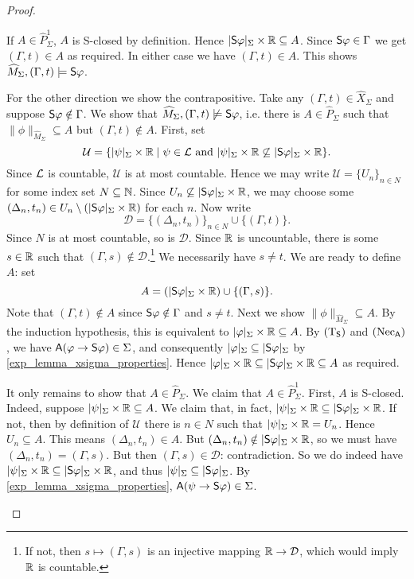 \begin{proof}
\begin{itemize}
    If $A \in \widehat{P}_\Sigma^1$, $A$ is S-closed by definition.  Hence
    $|\S\phi|_\Sigma \times \R \subseteq A$. Since $\S\phi \in \Gamma$ we get
    $(\Gamma, t) \in A$ as required.
    In either case we have $(\Gamma, t) \in A$. This shows $\widehat{M}_\Sigma,
    (\Gamma, t) \models \S\phi$.

    For the other direction we show the contrapositive. Take any $(\Gamma, t)
    \in \widehat{X}_\Sigma$ and suppose $\S\phi \notin \Gamma$. We show that
    $\widehat{M}_\Sigma, (\Gamma, t) \not\models \S\phi$, i.e. there is $A \in
    \widehat{P}_\Sigma$ such that $\|\phi\|_{\widehat{M}_\Sigma} \subseteq A$
    but $(\Gamma, t) \notin A$.
    First, set
    \[
        \mathcal{U} = \{
        |\psi|_\Sigma \times \R
        \mid
        \psi \in \cL \text{ and }
        |\psi|_\Sigma \times \R \not\subseteq |\S\phi|_\Sigma \times \R
        \}.
    \]
    Since $\cL$ is countable, $\mathcal{U}$ is at most countable.
    Hence we may write $\mathcal{U} = \{U_n\}_{n \in N}$ for some
    index set $N \subseteq \N$. Since $U_n \not\subseteq
    |\S\phi|_\Sigma \times \R$, we may choose some $(\Delta_n, t_n)
    \in U_n \setminus (|\S\phi|_\Sigma \times \R)$ for each $n$. Now
    write
    \[
      \mathcal{D} = \{(\Delta_n, t_n)\}_{n \in N} \cup \{(\Gamma,
      t)\}.
    \]
    Since $N$ is at most countable, so is $\mathcal{D}$.  Since
    $\R$ is uncountable, there is some $s \in \R$ such that $(\Gamma,
    s) \notin \mathcal{D}$.\footnote{If not, then $s \mapsto
    (\Gamma, s)$ is an injective mapping $\R \to \mathcal{D}$, which
    would imply $\R$ is countable.} We necessarily have $s \ne t$. We
    are ready to define $A$: set
    \[
      A = (|\S\phi|_\Sigma \times \R) \cup \{(\Gamma, s)\}.
    \]
    Note that $(\Gamma, t) \notin A$ since $\S\phi \notin \Gamma$ and
    $s \ne t$.
    Next we show $\|\phi\|_{\widehat{M}_\Sigma} \subseteq A$. By the
    induction hypothesis, this is equivalent to $|\phi|_\Sigma \times
    \R \subseteq A$. By $\Tsoundness$ and $\necuniv$, we have
    $\A(\phi \limplies \S\phi) \in \Sigma$, and consequently
    $|\phi|_\Sigma \subseteq |\S\phi|_\Sigma$ by
    \cref{exp_lemma_xsigma_properties}. Hence $|\phi|_\Sigma \times \R
    \subseteq |\S\phi|_\Sigma \times \R \subseteq A$ as required.

    It only remains to show that $A \in \widehat{P}_\Sigma$. We claim
    that $A \in \widehat{P}_\Sigma^1$. First, $A$ is S-closed.
    Indeed, suppose $|\psi|_\Sigma \times \R \subseteq A$. We claim
    that, in fact, $|\psi|_\Sigma \times \R \subseteq |\S\phi|_\Sigma
    \times \R$. If not, then by definition of $\mathcal{U}$ there is
    $n \in N$ such that $|\psi|_\Sigma \times \R = U_n$.  Hence $U_n
    \subseteq A$. This means $(\Delta_n, t_n) \in A$. But
    $(\Delta_n, t_n) \notin |\S\phi|_\Sigma \times \R$, so we must
    have $(\Delta_n, t_n) = (\Gamma, s)$. But then $(\Gamma, s) \in
    \mathcal{D}$: contradiction. So we do indeed have $|\psi|_\Sigma
    \times \R \subseteq |\S\phi|_\Sigma \times \R$, and thus
    $|\psi|_\Sigma \subseteq |\S\phi|_\Sigma$. By
    \cref{exp_lemma_xsigma_properties}, $\A(\psi \limplies \S\phi) \in
    \Sigma$.


\end{itemize}
\end{proof}
